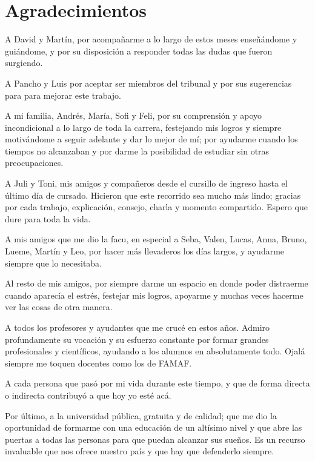 \documentclass[a4paper,12pt,spanish]{book}
\begin{document}

\cleardoublepage


\clearpage

\thispagestyle{empty}
\chapter*{Agradecimientos}
A David y Martín, por acompañarme a lo largo de estos meses enseñándome y guiándome,
y por su disposición a responder todas las dudas que fueron surgiendo.

A Pancho y Luis por aceptar ser miembros del tribunal y por sus sugerencias para
para mejorar este trabajo.

A mi familia, Andrés, María, Sofi y Feli, por su comprensión y apoyo incondicional a lo
largo de toda la carrera, festejando mis logros y siempre motivándome a seguir adelante y
dar lo mejor de mí; por ayudarme cuando los tiempos no alcanzaban y por darme la
posibilidad de estudiar sin otras preocupaciones.

A Juli y Toni, mis amigos y compañeros desde el cursillo de ingreso hasta el último día de
cursado. Hicieron que este recorrido sea mucho más lindo; gracias por cada trabajo,
explicación, consejo, charla y momento compartido. Espero que dure para toda la vida.

A mis amigos que me dio la facu, en especial a Seba, Valen, Lucas, Anna, Bruno,
Lueme, Martín y Leo, por hacer más llevaderos los días largos, y ayudarme siempre que
lo necesitaba.

Al resto de mis amigos, por siempre darme un espacio en donde poder distraerme cuando
aparecía el estrés, festejar mis logros, apoyarme y muchas veces hacerme ver las cosas de
otra manera.

A todos los profesores y ayudantes que me crucé en estos años. Admiro profundamente su
vocación y su esfuerzo constante por formar grandes profesionales y científicos, ayudando
a los alumnos en absolutamente todo. Ojalá siempre me toquen docentes como los de FAMAF.

A cada persona que pasó por mi vida durante este tiempo, y que de forma directa
o indirecta contribuyó a que hoy yo esté acá.

Por último, a la universidad pública, gratuita y de calidad; que me dio la oportunidad de
formarme con una educación de un altísimo nivel y que abre las puertas a todas las
personas para que puedan alcanzar sus sueños. Es un recurso invaluable que nos ofrece
nuestro país y que hay que defenderlo siempre.
\clearpage
\end{document}
